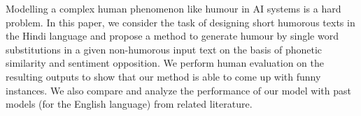 Modelling a complex human phenomenon like humour in AI systems is a hard problem. In this paper, we consider the task of designing short humorous texts in the Hindi language and propose a method to generate humour by single word substitutions in a given non-humorous input text on the basis of phonetic similarity and sentiment opposition. We perform human evaluation on the resulting outputs to show that our method is able to come up with funny instances. We also compare and analyze the performance of our model with past models (for the English language) from related literature.
